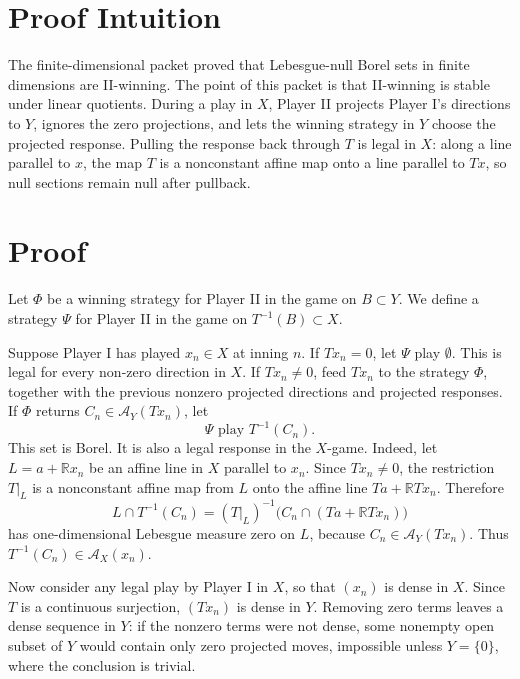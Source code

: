 \documentclass[11pt]{article}
\newcommand{\Acal}{\mathcal A}
\newcommand{\R}{\mathbb R}
\begin{document}
\section*{Proof Intuition}

The finite-dimensional packet proved that Lebesgue-null Borel sets in finite
dimensions are II-winning.  The point of this packet is that II-winning is
stable under linear quotients.  During a play in \(X\), Player II projects
Player I's directions to \(Y\), ignores the zero projections, and lets the
winning strategy in \(Y\) choose the projected response.  Pulling the response
back through \(T\) is legal in \(X\): along a line parallel to \(x\), the map
\(T\) is a nonconstant affine map onto a line parallel to \(Tx\), so null
sections remain null after pullback.

\section*{Proof}

Let \(\Phi\) be a winning strategy for Player II in the game on \(B\subset Y\).
We define a strategy \(\Psi\) for Player II in the game on \(T^{-1}(B)\subset
X\).

Suppose Player I has played \(x_n\in X\) at inning \(n\).  If \(T x_n=0\), let
\(\Psi\) play \(\emptyset\).  This is legal for every non-zero direction in
\(X\).  If \(T x_n\ne0\), feed \(T x_n\) to the strategy \(\Phi\), together
with the previous nonzero projected directions and projected responses.  If
\(\Phi\) returns \(C_n\in\Acal_Y(Tx_n)\), let
\[
        \Psi \text{ play } T^{-1}(C_n).
\]
This set is Borel.  It is also a legal response in the \(X\)-game.  Indeed,
let \(L=a+\R x_n\) be an affine line in \(X\) parallel to \(x_n\).  Since
\(Tx_n\ne0\), the restriction \(T|_L\) is a nonconstant affine map from \(L\)
onto the affine line \(T a+\R T x_n\).  Therefore
\[
        L\cap T^{-1}(C_n)
        =
        (T|_L)^{-1}\bigl(C_n\cap (T a+\R T x_n)\bigr)
\]
has one-dimensional Lebesgue measure zero on \(L\), because
\(C_n\in\Acal_Y(Tx_n)\).  Thus \(T^{-1}(C_n)\in\Acal_X(x_n)\).

Now consider any legal play by Player I in \(X\), so that \((x_n)\) is dense
in \(X\).  Since \(T\) is a continuous surjection, \((T x_n)\) is dense in
\(Y\).  Removing zero terms leaves a dense sequence in \(Y\): if the nonzero
terms were not dense, some nonempty open subset of \(Y\) would contain only
zero projected moves, impossible unless \(Y=\{0\}\), where the conclusion is
trivial.
\end{document}

